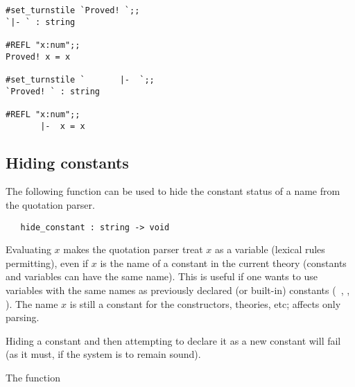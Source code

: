 {{\begin{session}
\begin{verbatim}
#set_turnstile `Proved! `;;
`|- ` : string

#REFL "x:num";;
Proved! x = x

#set_turnstile `       |-  `;;
`Proved! ` : string

#REFL "x:num";;
       |-  x = x
\end{verbatim}\end{session}

\subsection{Hiding constants}
\label{hidden}

The following function can be used to hide the constant  status of  a name from
the quotation parser.

\begin{boxed}
\begin{verbatim}
   hide_constant : string -> void
\end{verbatim}\end{boxed}


\noindent Evaluating $x$
makes the quotation parser treat $x$ as a variable (lexical
rules permitting), even if $x$ is the name of a constant in the current theory
(constants and variables can have the same name).  
This is useful if one wants to use variables  with the same names
as previously declared (or built-in) constants (\eg\ , ,  
\etc). 
The name $x$ is still a
constant for the constructors, theories, etc;  
affects only  parsing.

Hiding a constant and then attempting to declare it as a new
constant will fail (as it must, if the system is to remain sound).

The function

}}
